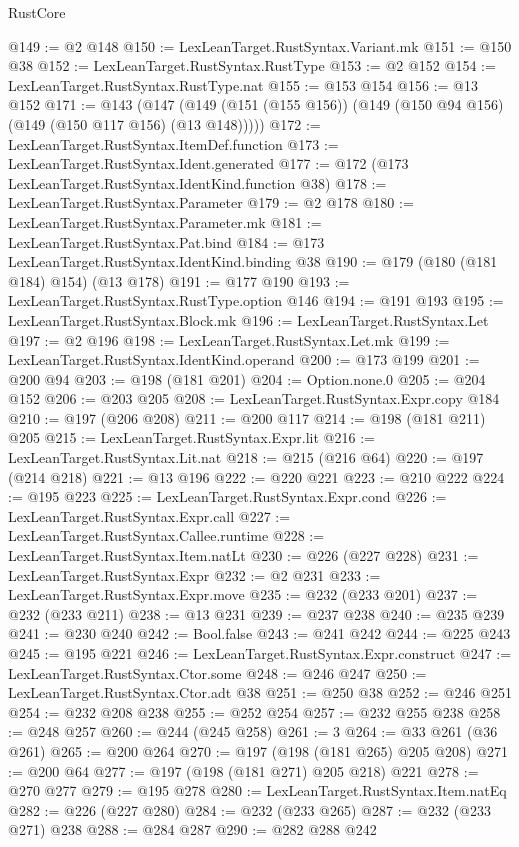 \begin{lexlean}{RustCore}
\begin{coremodule}
@149 := @2 @148
@150 := LexLeanTarget.RustSyntax.Variant.mk
@151 := @150 @38
@152 := LexLeanTarget.RustSyntax.RustType
@153 := @2 @152
@154 := LexLeanTarget.RustSyntax.RustType.nat
@155 := @153 @154
@156 := @13 @152
@171 := @143
    (@147 (@149 (@151 (@155 @156)) (@149 (@150 @94 @156) (@149 (@150 @117 @156) (@13 @148)))))
@172 := LexLeanTarget.RustSyntax.ItemDef.function
@173 := LexLeanTarget.RustSyntax.Ident.generated
@177 := @172 (@173 LexLeanTarget.RustSyntax.IdentKind.function @38)
@178 := LexLeanTarget.RustSyntax.Parameter
@179 := @2 @178
@180 := LexLeanTarget.RustSyntax.Parameter.mk
@181 := LexLeanTarget.RustSyntax.Pat.bind
@184 := @173 LexLeanTarget.RustSyntax.IdentKind.binding @38
@190 := @179 (@180 (@181 @184) @154) (@13 @178)
@191 := @177 @190
@193 := LexLeanTarget.RustSyntax.RustType.option @146
@194 := @191 @193
@195 := LexLeanTarget.RustSyntax.Block.mk
@196 := LexLeanTarget.RustSyntax.Let
@197 := @2 @196
@198 := LexLeanTarget.RustSyntax.Let.mk
@199 := LexLeanTarget.RustSyntax.IdentKind.operand
@200 := @173 @199
@201 := @200 @94
@203 := @198 (@181 @201)
@204 := Option.none.{0}
@205 := @204 @152
@206 := @203 @205
@208 := LexLeanTarget.RustSyntax.Expr.copy @184
@210 := @197 (@206 @208)
@211 := @200 @117
@214 := @198 (@181 @211) @205
@215 := LexLeanTarget.RustSyntax.Expr.lit
@216 := LexLeanTarget.RustSyntax.Lit.nat
@218 := @215 (@216 @64)
@220 := @197 (@214 @218)
@221 := @13 @196
@222 := @220 @221
@223 := @210 @222
@224 := @195 @223
@225 := LexLeanTarget.RustSyntax.Expr.cond
@226 := LexLeanTarget.RustSyntax.Expr.call
@227 := LexLeanTarget.RustSyntax.Callee.runtime
@228 := LexLeanTarget.RustSyntax.Item.natLt
@230 := @226 (@227 @228)
@231 := LexLeanTarget.RustSyntax.Expr
@232 := @2 @231
@233 := LexLeanTarget.RustSyntax.Expr.move
@235 := @232 (@233 @201)
@237 := @232 (@233 @211)
@238 := @13 @231
@239 := @237 @238
@240 := @235 @239
@241 := @230 @240
@242 := Bool.false
@243 := @241 @242
@244 := @225 @243
@245 := @195 @221
@246 := LexLeanTarget.RustSyntax.Expr.construct
@247 := LexLeanTarget.RustSyntax.Ctor.some
@248 := @246 @247
@250 := LexLeanTarget.RustSyntax.Ctor.adt @38
@251 := @250 @38
@252 := @246 @251
@254 := @232 @208 @238
@255 := @252 @254
@257 := @232 @255 @238
@258 := @248 @257
@260 := @244 (@245 @258)
@261 := 3
@264 := @33 @261 (@36 @261)
@265 := @200 @264
@270 := @197 (@198 (@181 @265) @205 @208)
@271 := @200 @64
@277 := @197 (@198 (@181 @271) @205 @218) @221
@278 := @270 @277
@279 := @195 @278
@280 := LexLeanTarget.RustSyntax.Item.natEq
@282 := @226 (@227 @280)
@284 := @232 (@233 @265)
@287 := @232 (@233 @271) @238
@288 := @284 @287
@290 := @282 @288 @242

\end{coremodule}
\end{lexlean}
